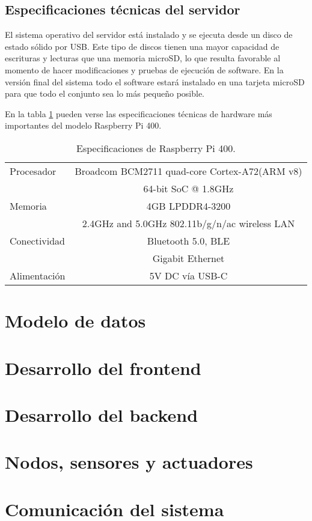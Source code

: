 \subsection{Especificaciones técnicas del servidor}

El sistema operativo del servidor está instalado y se ejecuta desde un disco de estado sólido por USB. Este tipo de discos tienen una mayor capacidad de escrituras y lecturas que una memoria microSD, lo que resulta favorable al momento de hacer modificaciones y pruebas de ejecución de software. En la versión final del sistema todo el software estará instalado en una tarjeta microSD para que todo el conjunto sea lo más pequeño posible.

En la tabla \ref{tab:Especificaciones Raspberry Pi 400} pueden verse las especificaciones técnicas de hardware más importantes del modelo Raspberry Pi 400.

\begin{table}[h]
\centering
\caption[Raspberry Pi 400]{Especificaciones de Raspberry Pi 400.}
\begin{tabular}{l c}
\toprule
Procesador		&	Broadcom BCM2711 quad-core Cortex-A72(ARM v8) \\
				&	64-bit SoC @ 1.8GHz \\
\midrule
Memoria			&	4GB LPDDR4-3200 \\
\midrule
				&	2.4GHz and 5.0GHz 802.11b/g/n/ac wireless LAN \\
Conectividad		&	Bluetooth 5.0, BLE\\
				&   Gigabit Ethernet \\
\midrule
Alimentación		&	5V DC vía USB-C\\
\bottomrule
\hline
\end{tabular}
\label{tab:Especificaciones Raspberry Pi 400}
\end{table}

\section{Modelo de datos}



\section{Desarrollo del frontend}



\section{Desarrollo del backend}



\section{Nodos, sensores y actuadores}



\section{Comunicación del sistema}